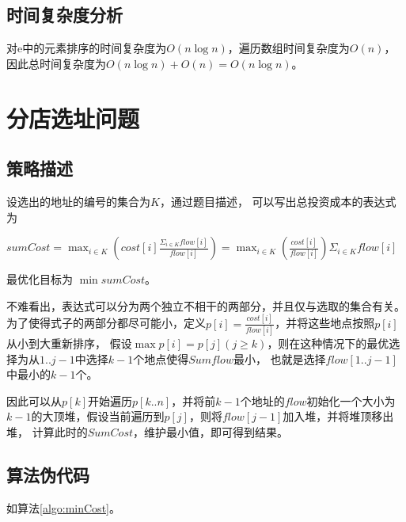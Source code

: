 \subsection{时间复杂度分析}
对e中的元素排序的时间复杂度为$O(n\log n)$，遍历数组时间复杂度为$O(n)$，因此总时间复杂度为$O(n \log n) + O(n) = O(n \log n)$。


\section{分店选址问题}

\subsection{策略描述}

设选出的地址的编号的集合为$K$，通过题目描述，
可以写出总投资成本的表达式为

$sumCost= \max_{i \in K} (cost[i] \frac{\Sigma_{i \in K}flow[i]}{flow[i]}) = \max_{i \in K}(\frac{cost[i]}{flow[i]})\Sigma_{i \in K}flow[i]$

最优化目标为 $\min sumCost$。

不难看出，表达式可以分为两个独立不相干的两部分，并且仅与选取的集合有关。
为了使得式子的两部分都尽可能小，定义$p[i] = \frac{cost[i]}{flow[i]}$，并将这些地点按照$p[i]$从小到大重新排序，
假设$\max p[i] = p[j](j \ge k)$，则在这种情况下的最优选择为从$1..j-1$中选择$k-1$个地点使得$Sumflow$最小，
也就是选择$flow[1..j-1]$中最小的$k-1$个。

因此可以从$p[k]$开始遍历$p[k..n]$，并将前$k-1$个地址的$flow$初始化一个大小为$k-1$的大顶堆，假设当前遍历到$p[j]$，则将$flow[j-1]$加入堆，并将堆顶移出堆，
计算此时的$SumCost$，维护最小值，即可得到结果。

\subsection{算法伪代码}

如算法\ref{algo:minCost}。

